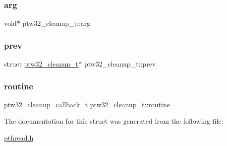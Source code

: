 \subsubsection{\texorpdfstring{arg}{arg}}
{\footnotesize\ttfamily void$\ast$ ptw32\+\_\+cleanup\+\_\+t\+::arg}

\mbox{\label{structptw32__cleanup__t_a01e8236d7e28e823b8277e81e9e03d03}} 
\subsubsection{\texorpdfstring{prev}{prev}}
{\footnotesize\ttfamily struct \mbox{\hyperlink{structptw32__cleanup__t}{ptw32\+\_\+cleanup\+\_\+t}}$\ast$ ptw32\+\_\+cleanup\+\_\+t\+::prev}

\mbox{\label{structptw32__cleanup__t_ad197a94dcb95ce712f2d8f6c141a9aef}} 
\subsubsection{\texorpdfstring{routine}{routine}}
{\footnotesize\ttfamily ptw32\+\_\+cleanup\+\_\+callback\+\_\+t ptw32\+\_\+cleanup\+\_\+t\+::routine}



The documentation for this struct was generated from the following file\+:\begin{DoxyCompactItemize}
\item 
\mbox{\hyperlink{pthread_8h}{pthread.\+h}}\end{DoxyCompactItemize}
